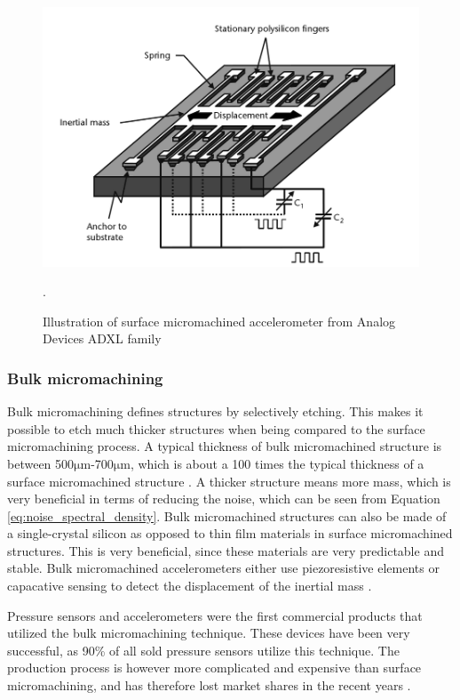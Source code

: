 \begin{figure}[h]
\centering
\includegraphics[scale=0.3]{fig/surface_micromachined.png}
\caption{Illustration of surface micromachined accelerometer from Analog Devices ADXL family \cite[p.~101]{maluf04}}.
\label{fig:surface_micromachined}
\end{figure}

\subsubsection{Bulk micromachining}

Bulk micromachining defines structures by selectively etching. This makes it possible to etch much thicker structures when being compared to the surface micromachining process. A typical thickness of bulk micromachined structure is between 500$\si{\micro\meter}$-700$\si{\micro\meter}$, which is about a 100 times the typical thickness of a surface micromachined structure \cite[p.~7]{kaajakari09}. A thicker structure means more mass, which is very beneficial in terms of reducing the noise, which can be seen from Equation \ref{eq:noise_spectral_density}. Bulk micromachined structures can also be made of a single-crystal silicon as opposed to thin film materials in surface micromachined structures. This is very beneficial, since these materials are very predictable and stable. Bulk micromachined accelerometers either use piezoresistive elements or capacative sensing to detect the displacement of the inertial mass \cite[p.~7]{kaajakari09}.

Pressure sensors and accelerometers were the first commercial products that utilized the bulk micromachining technique. These devices have been very successful, as 90\% of all sold pressure sensors utilize this technique. The production process is however more complicated and expensive than surface micromachining, and has therefore lost market shares in the recent years \cite[p.~7]{kaajakari09}.


